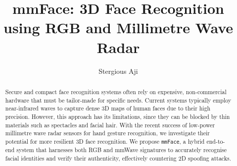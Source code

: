 \documentclass{mpaper}
\begin{document}
\title{mmFace: 3D Face Recognition using RGB and Millimetre Wave Radar}
\author{Stergious Aji}

\maketitle




\begin{abstract}
    Secure and compact face recognition systems often rely on expensive, non-commercial hardware that must be tailor-made for specific needs. Current systems typically employ near-infrared waves to capture dense 3D maps of human faces due to their high precision. However, this approach has its limitations, since they can be blocked by thin materials such as spectacles and facial hair. With the recent success of low-power millimetre wave radar sensors for hand gesture recognition, we investigate their potential for more resilient 3D face recognition. We propose \texttt{mmFace}, a hybrid end-to-end system that harnesses both RGB and mmWave signatures to accurately recognise facial identities and verify their authenticity, effectively countering 2D spoofing attacks.
    \vspace{-0.2cm}
\end{abstract}
\vspace{0.1cm}
\end{document}
